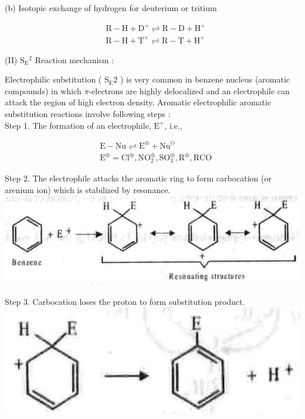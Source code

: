 \documentclass[10pt]{article}
\begin{document}
(b) Isotopic exchange of hydrogen for deuterium or tritium

$$
\begin{aligned}
& \mathrm{R}-\mathrm{H}+\mathrm{D}^{+} \rightleftharpoons \mathrm{R}-\mathrm{D}+\mathrm{H}^{+} \\
& \mathrm{R}-\mathrm{H}+\mathrm{T}^{+} \rightleftharpoons \mathrm{R}-\mathrm{T}+\mathrm{H}^{+}
\end{aligned}
$$

(II) $\mathrm{S}_{\mathrm{E}}{ }^{2}$ Reaction mechanism :

Electrophilic substitution ( $\mathrm{S}_{\mathrm{E}} 2$ ) is very common in benzene nucleus (aromatic compounds) in which $\pi$-electrons are highly delocalized and an electrophile can attack the region of high electron density. Aromatic electrophilic aromatic substitution reactions involve following steps :\\
Step 1. The formation of an electrophile, $\mathrm{E}^{+}$, i.e.,

$$
\begin{aligned}
& \mathrm{E}-\mathrm{Nu} \rightleftharpoons \mathrm{E}^{\oplus}+\mathrm{Nu}^{\ominus} \\
& \mathrm{E}^{\oplus}=\mathrm{Cl}^{\oplus}, \mathrm{NO}_{2}^{\oplus}, \mathrm{SO}_{3}^{\oplus}, \mathrm{R}^{\oplus}, \mathrm{RCO}
\end{aligned}
$$

Step 2. The electrophile attacks the aromatic ring to form carbocation (or arenium ion) which is stabilized by resonance.\\
\includegraphics[max width=\textwidth, center]{2025_01_28_8470952b98110cec3aabg-094(4)}

Step 3. Carbocation loses the proton to form substitution product.\\
\includegraphics[max width=\textwidth, center]{2025_01_28_8470952b98110cec3aabg-094(3)}
\end{document}
